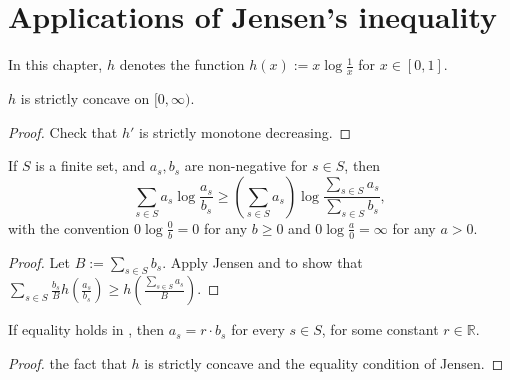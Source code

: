 \chapter{Applications of Jensen's inequality}

In this chapter, $h$ denotes the function $h(x) := x \log \frac{1}{x}$ for $x \in [0,1]$.

\begin{lemma}[Concavity]\label{concave}
  \leanok
  $h$ is strictly concave on $[0,\infty)$.
\end{lemma}

\begin{proof} \leanok Check that $h'$ is strictly monotone decreasing.
\end{proof}


\begin{lemma}
  \label{log-sum}\leanok
  If $S$ is a finite set, and $a_s,b_s$ are non-negative for $s\in S$, then
  $$\sum_{s\in S} a_s \log\frac{a_s}{b_s}\ge \left(\sum_{s\in S}a_s\right)\log\frac{\sum_{s\in S} a_s}{\sum_{s\in S} b_s},$$
  with the convention $0\log\frac{0}{b}=0$ for any $b\ge 0$ and $0\log\frac{a}{0}=\infty$ for any $a>0$.
\end{lemma}
\begin{proof}\leanok
  Let $B:=\sum_{s\in S} b_s$. Apply Jensen and  to show that $\sum_{s\in S} \frac{b_s}{B} h(\frac{a_s}{b_s})\ge h(\frac{\sum_{s\in S} a_s}{B})$.
\end{proof}

\begin{lemma}
  \label{converse-log-sum}\leanok
If equality holds in , then $a_s=r\cdot b_s$ for every $s\in S$, for some constant $r\in \mathbb{R}$.
\end{lemma}

\begin{proof}\leanokBy the fact that $h$ is strictly concave and the equality condition of Jensen.
\end{proof}
